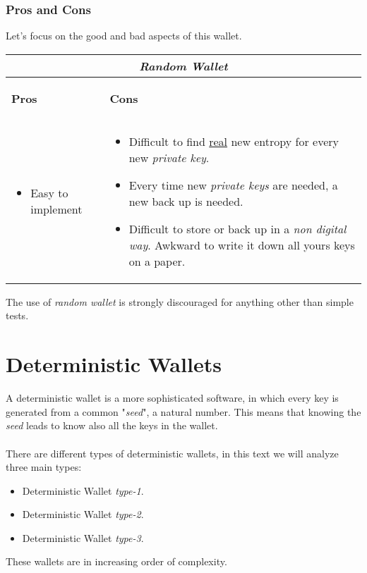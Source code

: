 \subsubsection{Pros and Cons}
Let's focus on the good and bad aspects of this wallet.

\begin{center}
	\begin{tabular}{ |p{6cm}|p{6cm}|  }
		\hline
		\multicolumn{2}{|c|}{\textbf{\textit{Random Wallet}}} \\
		\hline \hline 
		\begin{center}
			\textbf{Pros}
		\end{center}&\begin{center}
			\textbf{Cons}
		\end{center}\\
		\hline
		\begin{itemize}
			\item Easy to implement
		\end{itemize} &
		\begin{itemize}
			\item Difficult to find \underline{real} new entropy for every new \textit{private key}.
			\item Every time new \textit{private keys} are needed, a new back up is needed.
			\item Difficult to store or back up in a \textit{non digital way}. Awkward to write it down all yours keys on a paper.
		\end{itemize}\\
		\hline
	\end{tabular}
\end{center}
The use of \textit{random wallet} is strongly discouraged for anything other than simple tests.

\section{Deterministic Wallets}
A deterministic wallet is a more sophisticated software, in which every key is generated from a common "\textit{seed}", a natural number. This means that knowing the \textit{seed} leads to know also all the keys in the wallet.\\ \\
There are different types of deterministic wallets, in this text we will analyze three main types:
\begin{itemize}
	\item Deterministic Wallet \textit{type-1}.
	\item Deterministic Wallet \textit{type-2}.
	\item Deterministic Wallet \textit{type-3}.
\end{itemize}
These wallets are in increasing order of complexity.

